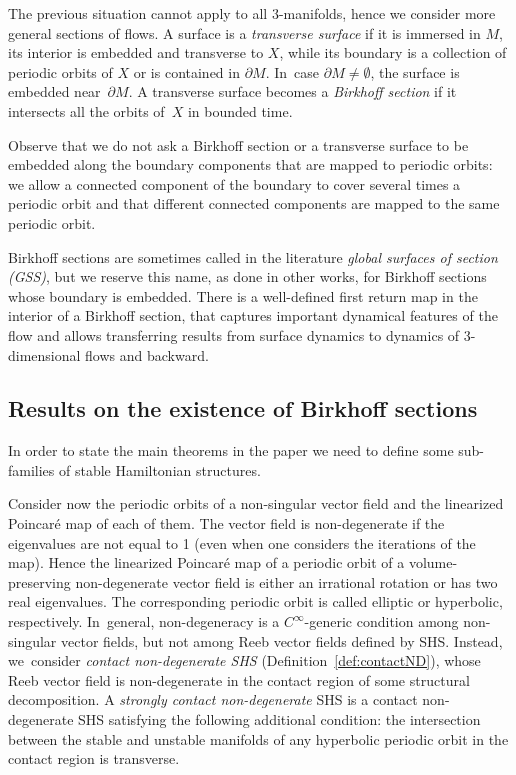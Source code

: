 \documentclass[10pt]{amsart}
\newcommand{\threemanifolds}{$3$\nobreakdash-mani\-folds\xspace}
\theoremstyle{definition}
\begin{document}
The previous situation cannot apply to all \threemanifolds, hence we consider more general sections of flows.
A surface is a \emph{transverse surface} if it is immersed in $M$, its interior is embedded and transverse to $X$, while its boundary is a collection of periodic orbits of $X$ or is contained in $\partial M$. In~case $\partial M\neq \emptyset$, the surface is embedded near~$\partial M$. A transverse surface becomes a \emph{Birkhoff section} if it intersects all the orbits of~$X$ in bounded time.

Observe that we do not ask a Birkhoff section or a transverse surface to be embedded along the boundary components that are mapped to periodic orbits: we allow a connected component of the boundary to cover several times a periodic orbit and that different connected components are mapped to the same periodic orbit.

Birkhoff sections are sometimes called in the literature \emph{global surfaces of section (GSS)}, but we reserve this name, as done in other works, for Birkhoff sections whose boundary is embedded. There is a well-defined first return map in the interior of a Birkhoff section, that captures important dynamical features of the flow and allows transferring results from surface dynamics to dynamics of 3-dimensional flows and backward.

\subsection{Results on the existence of Birkhoff sections} In order to state the main theorems in the paper we need to define some sub-families of stable Hamiltonian structures.

Consider now the periodic orbits of a non-singular vector field and the linearized Poincaré map of each of them.
The vector field is non-degenerate if the eigenvalues are not equal to 1 (even when one considers the iterations of the map). Hence the linearized Poincaré map of a periodic orbit of a volume-preserving non-degenerate vector field is either an irrational rotation or has two real eigenvalues. The corresponding periodic orbit is called elliptic or hyperbolic, respectively. In~general, non-degeneracy is a $C^\infty$\nobreakdash-generic condition among non-singular vector fields, but not among Reeb vector fields defined by SHS. Instead, we~consider \emph{contact non-degenerate SHS} (Definition~\ref{def:contactND}), whose Reeb vector field is non-degenerate in the contact region of some structural decomposition. A \emph{strongly contact non-degenerate} SHS is a contact non-degenerate SHS satisfying the following additional condition: the intersection between the stable and unstable manifolds of any hyperbolic periodic orbit in the contact region is transverse.
\end{document}
